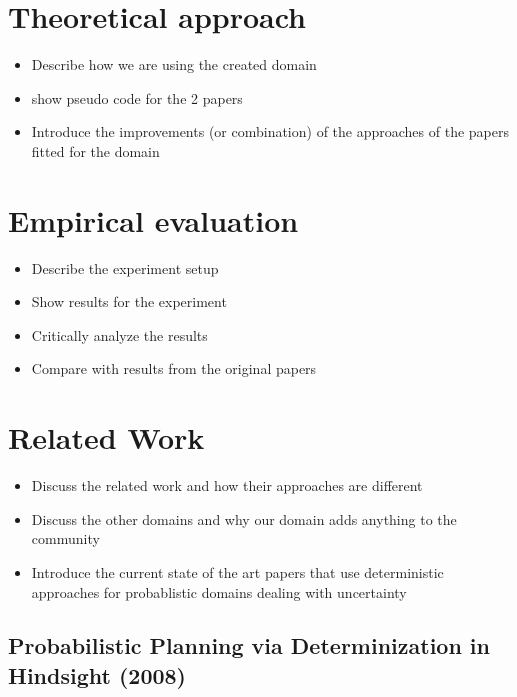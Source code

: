 \documentclass[runningheads,a4paper]{llncs}
\begin{document}

\section{Theoretical approach}

\begin{itemize}
	\item Describe how we are using the created domain
	\item show pseudo code for the 2 papers
	\item Introduce the improvements (or combination) of the approaches of the papers fitted for the domain
\end{itemize}


\section{Empirical evaluation}

\begin{itemize}
	\item Describe the experiment setup
	\item Show results for the experiment
	\item Critically analyze the results
	\item Compare with results from the original papers
\end{itemize}


\section{Related Work}

\begin{itemize}
	\item Discuss the related work and how their approaches are different
	\item Discuss the other domains and why our domain adds anything to the community
	\item Introduce the current state of the art papers that use deterministic approaches for probablistic domains dealing with uncertainty
\end{itemize}

\subsection{Probabilistic Planning via Determinization in Hindsight (2008)~\cite{yoon2008probabilistic}}
\end{document}
